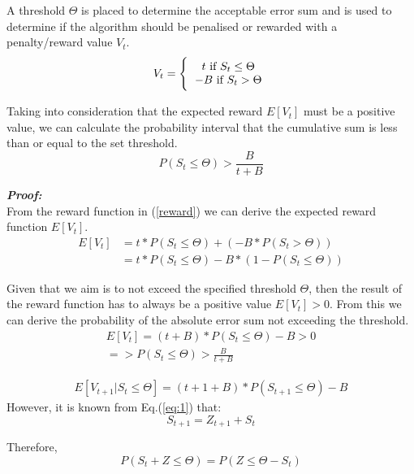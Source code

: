 \documentclass{mpaper}
\begin{document}
A threshold $\Theta$ is placed to determine the acceptable error sum and is used to determine if the algorithm should be penalised or rewarded with a penalty/reward value $V_t$.
\begin{equation}\label{reward}
    V_t = \Bigg\{ \begin{tabular}{c}
                  $t\ \text{if}\ S_t \leq \Theta$ \\
                  $-B\ \text{if}\ S_t > \Theta$
                  \end{tabular}
\end{equation}

Taking into consideration that the expected reward $E[V_t]$ must be a positive value, we can calculate the probability interval that the cumulative sum is less than or equal to the set threshold.
\begin{equation}
    P(S_t \leq \Theta) > \frac{B}{t+B}
\end{equation}

\emph{\textbf{Proof:}} \\
From the reward function in (\ref{reward}) we can derive the expected reward function $E[V_t]$. 
\begin{equation}
\begin{split}
    E[V_t] & = t * P(S_t \leq \Theta) + (-B * P(S_t > \Theta))\\
    & = t * P(S_t \leq \Theta) - B * (1 - P(S_t \leq \Theta))
\end{split}
\end{equation}

Given that we aim is to not exceed the specified threshold $\Theta$, then the result of the reward function has to always be a positive value $E[V_t] > 0$. From this we can derive the probability of the absolute error sum not exceeding the threshold.
\begin{multline*}
    E[V_t] = (t + B) * P(S_t \leq \Theta) - B > 0\\
    =>  P(S_t \leq \Theta) > \frac{B}{t+B}
\end{multline*}

\begin{align*}
    E[V_{t+1}|S_t\leq\Theta] = (t+1+B)*P(S_{t+1}\leq\Theta) - B
\end{align*}
However, it is known from Eq.(\ref{eq:1}) that:
\begin{equation*}
    S_{t+1} = Z_{t+1} + S_t
\end{equation*}

Therefore, 
\begin{equation*}
    P(S_t + Z \leq \Theta) = P(Z\leq\Theta-S_t)
\end{equation*}
\end{document}
